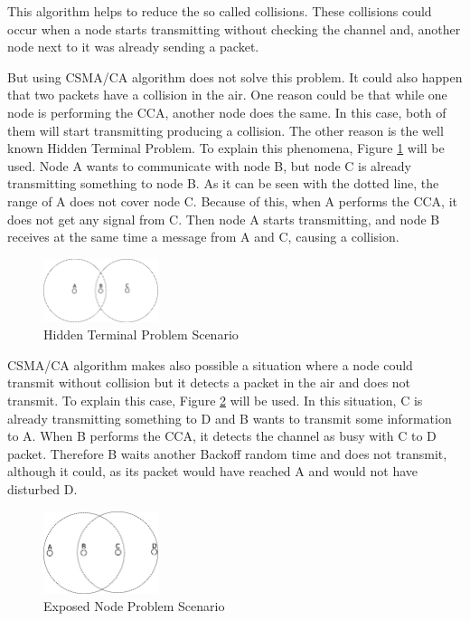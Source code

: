 This algorithm helps to reduce the so called collisions. These collisions could occur when a node starts transmitting without checking the 
channel and, another node next to it was already sending a packet.

But using \ac{CSMA/CA} algorithm does not solve this problem. It could also happen that two packets have a collision in the air. One 
reason could be that while one node is performing the \ac{CCA}, another node does the same. In this case, both of them will start transmitting 
producing a collision. The other reason is the well known Hidden Terminal Problem. To explain this phenomena, Figure \ref{fig:HiddenTerminalProblem}
will be used. Node A wants to communicate with node B, but node C is already transmitting something to node B. As it can be seen with the dotted line,
the range of A does not cover node C. Because of this, when A performs the \ac{CCA}, it does not get any signal from C. Then node A starts transmitting, and 
node B receives at the same time a message from A and C, causing a collision.

\begin{figure}[!ht]
 \begin{center}
  \includegraphics[width=0.3\textwidth]{HiddenTerminalProblem.eps}
 \end{center}
 \caption{Hidden Terminal Problem Scenario}
 \label{fig:HiddenTerminalProblem}
\end{figure}

\ac{CSMA/CA} algorithm makes also possible a situation where a node could transmit without collision but it detects a packet in the air and does
not transmit. To explain this case, Figure \ref{fig:ExposedNodeProblem} will be used. In this situation, C is already transmitting something to D and B 
wants to transmit some information to A. When B performs the \ac{CCA}, it detects the channel as busy with C to D packet. Therefore B waits another
Backoff random time and does not transmit, although it could, as its packet would have reached A and would not have disturbed D.

\begin{figure}[!ht]
 \begin{center}
  \includegraphics[width=0.3\textwidth]{ExposedNodeProblem.eps}
 \end{center}
 \caption{Exposed Node Problem Scenario}
 \label{fig:ExposedNodeProblem}
\end{figure}

